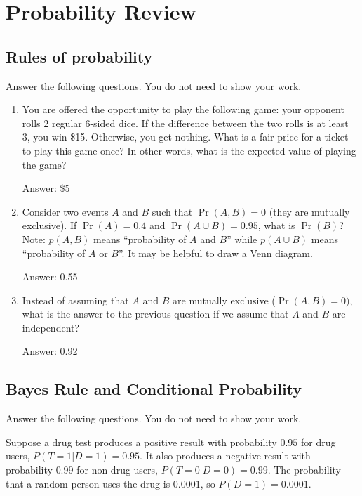 \documentclass{article}
\def\ans#1{\par\gre{Answer: #1}}
\def\blu#1{{\color{blu}#1}}
\def\gre#1{{\color{gre}#1}}
\begin{document}
\section{Probability Review}
\subsection{Rules of probability}

\blu{Answer the following questions.} You do not need to show your work.

\begin{enumerate}
\item You are offered the opportunity to play the following game: your opponent rolls 2 regular 6-sided dice. If the difference between the two rolls is at least 3, you win \$15. Otherwise, you get nothing. What is a fair price for a ticket to play this game once? In other words, what is the expected value of playing the game?
\ans{\$5}
\item Consider two events $A$ and $B$ such that $\Pr(A, B)=0$ (they are mutually exclusive). If $\Pr(A) = 0.4$ and $\Pr(A \cup B) = 0.95$, what is $\Pr(B)$? Note: $p(A, B)$ means
``probability of $A$ and $B$'' while $p(A \cup B)$ means ``probability of $A$ or $B$''. It may be helpful to draw a Venn diagram.
\ans{0.55}
\item Instead of assuming that $A$ and $B$ are mutually exclusive ($\Pr(A,B) = 0)$, what is the answer to the previous question if we assume that $A$ and $B$ are independent?
\ans{0.92}
\end{enumerate}

\subsection{Bayes Rule and Conditional Probability}

\blu{Answer the following questions.} You do not need to show your work.

Suppose a drug test produces a positive result with probability $0.95$ for drug users, $P(T=1|D=1)=0.95$. It also produces a negative result with probability $0.99$ for non-drug users, $P(T=0|D=0)=0.99$. The probability that a random person uses the drug is $0.0001$, so $P(D=1)=0.0001$. 
\end{document}
